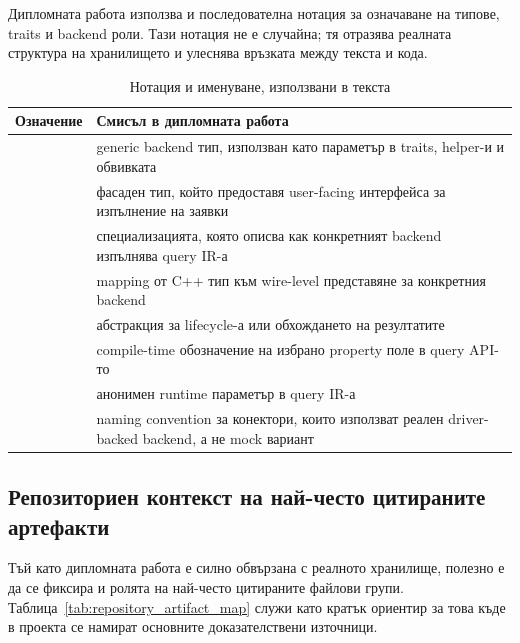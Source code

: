 Дипломната работа използва и последователна нотация за означаване на типове, traits и backend роли. Тази нотация не е случайна; тя отразява реалната структура на хранилището и улеснява връзката между текста и кода.

\begin{table}[H]
\centering
\small
\caption{Нотация и именуване, използвани в текста}
\label{tab:naming_conventions_glossary}
\begin{tabularx}{\textwidth}{L{3.6cm}Y}
\toprule
\textbf{Означение} & \textbf{Смисъл в дипломната работа} \\
\midrule
{} & generic backend тип, използван като параметър в traits, helper-и и  обвивката \\
 & фасаден тип, който предоставя user-facing интерфейса за изпълнение на заявки \\
 & специализацията, която описва как конкретният backend изпълнява query IR-а \\
 & mapping от C++ тип към wire-level представяне за конкретния backend \\
 & абстракция за lifecycle-а или обхождането на резултатите \\
 & compile-time обозначение на избрано property поле в query API-то \\
 & анонимен runtime параметър в query IR-а \\
 & naming convention за конектори, които използват реален driver-backed backend, а не mock вариант \\
\bottomrule
\end{tabularx}
\end{table}

\subsection{Репозиториен контекст на най-често цитираните артефакти}

Тъй като дипломната работа е силно обвързана с реалното хранилище, полезно е да се фиксира и ролята на най-често цитираните файлови групи. Таблица~\ref{tab:repository_artifact_map} служи като кратък ориентир за това къде в проекта се намират основните доказателствени източници.

